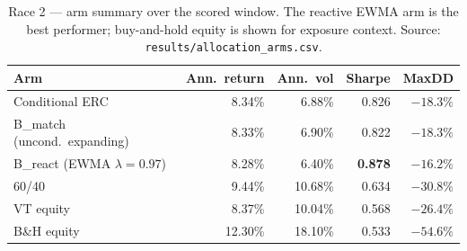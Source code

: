 \begin{table}[t]
\centering
\small
\caption{Race 2 --- arm summary over the scored window. The reactive EWMA arm is the best performer;
buy-and-hold equity is shown for exposure context. Source: \texttt{results/allocation\_arms.csv}.}
\label{tab:exp2arms}
\begin{tabular}{lrrrr}
\toprule
Arm & Ann.\ return & Ann.\ vol & Sharpe & MaxDD \\
\midrule
Conditional ERC              & 8.34\% & 6.88\%  & 0.826 & $-18.3\%$ \\
B\_match (uncond.\ expanding) & 8.33\% & 6.90\%  & 0.822 & $-18.3\%$ \\
B\_react (EWMA $\lambda{=}0.97$) & 8.28\% & 6.40\% & \textbf{0.878} & $-16.2\%$ \\
60/40                        & 9.44\% & 10.68\% & 0.634 & $-30.8\%$ \\
VT equity                    & 8.37\% & 10.04\% & 0.568 & $-26.4\%$ \\
B\&H equity                  & 12.30\% & 18.10\% & 0.533 & $-54.6\%$ \\
\bottomrule
\end{tabular}
\end{table}
